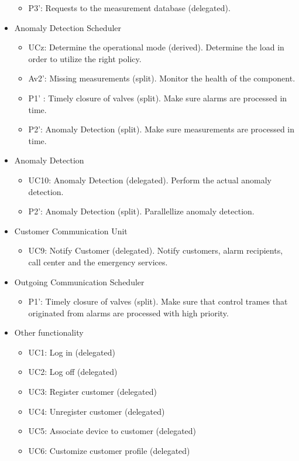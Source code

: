 \begin{itemize}
\begin{itemize}
	  	\item P3': Requests to the measurement database (delegated). 
	\end{itemize}
	\item Anomaly Detection Scheduler
	\begin{itemize}
		\item UCz: Determine the operational mode (derived). Determine the load in
		order to utilize the right policy.
		\item Av2': Missing measurements (split). Monitor the health of the
	  	component.
		\item P1' : Timely closure of valves (split). Make sure alarms are processed
		in time. 
	  	\item P2': Anomaly Detection (split). Make sure measurements are processed
	  	in time. 
	\end{itemize}
	\item Anomaly Detection
	\begin{itemize}
		\item UC10: Anomaly Detection (delegated). Perform the actual anomaly
		detection.
		\item P2': Anomaly Detection (split). Parallellize anomaly detection.
	\end{itemize}
	\item Customer Communication Unit
	\begin{itemize}
		\item UC9: Notify Customer (delegated). Notify customers, alarm recipients,
		call center and the emergency services. 
	\end{itemize}
	\item Outgoing Communication Scheduler
	\begin{itemize}
	  \item P1': Timely closure of valves (split). Make sure that control trames
	  that originated from alarms are processed with high priority. 
	\end{itemize}
	\item Other functionality
	\begin{itemize}
	  	\item UC1: Log in (delegated)
	  	\item UC2: Log off (delegated)
	  	\item UC3: Register customer (delegated)
	  	\item UC4: Unregister customer (delegated)
	  	\item UC5: Associate device to customer (delegated)
	  	\item UC6: Customize customer profile (delegated)

\end{itemize}
\end{itemize}
